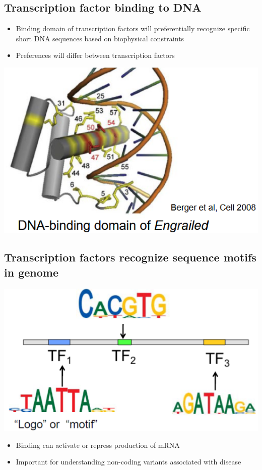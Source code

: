 \documentclass[10pt]{article}
\begin{document}
\subsection*{Transcription factor binding to DNA}
\begin{itemize}
	\item Binding domain of transcription factors will preferentially recognize specific short DNA sequences based on biophysical constraints
	\item Preferences will differ between transcription factors
\end{itemize}
\begin{center} 
	\includegraphics*[scale=0.8]{W7_2.png} 
\end{center}

\subsection*{Transcription factors recognize sequence motifs in genome}
\begin{center} 
	\includegraphics*[scale=0.8]{W7_3.png} 
\end{center}
\begin{itemize}
	\item Binding can activate or repress production of mRNA
	\item Important for understanding non-coding variants associated with disease
\end{itemize}
\end{document}
